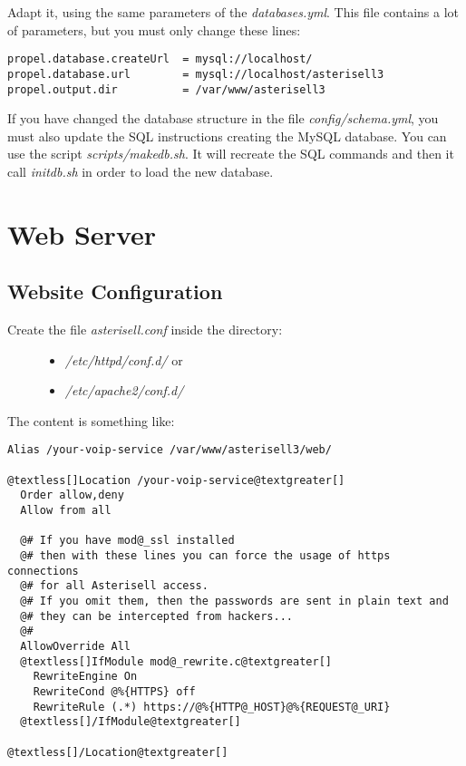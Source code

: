 \documentclass[letterpaper,10pt,english]{sphinxmanual}
\begin{document}
Adapt it, using the same parameters of the \emph{databases.yml}. This file contains a lot of parameters, but you must only change these lines:

\begin{Verbatim}[commandchars=@\[\]]
propel.database.createUrl  = mysql://localhost/
propel.database.url        = mysql://localhost/asterisell3
propel.output.dir          = /var/www/asterisell3
\end{Verbatim}

If you have changed the database structure in the file \emph{config/schema.yml}, you must also update the SQL instructions creating the MySQL database. You can use the script \emph{scripts/makedb.sh}. It will recreate the SQL commands and then it call \emph{initdb.sh} in order to load the new database.


\section{Web Server}
\label{index:web-server}

\subsection{Website Configuration}
\label{index:website-configuration}\begin{description}
\item[{Create the file \emph{asterisell.conf} inside the directory:}] \leavevmode\begin{itemize}
\item {} 
\emph{/etc/httpd/conf.d/} or

\item {} 
\emph{/etc/apache2/conf.d/}

\end{itemize}

\end{description}

The content is something like:

\begin{Verbatim}[commandchars=@\[\]]
Alias /your-voip-service /var/www/asterisell3/web/

@textless[]Location /your-voip-service@textgreater[]
  Order allow,deny
  Allow from all

  @# If you have mod@_ssl installed
  @# then with these lines you can force the usage of https connections
  @# for all Asterisell access.
  @# If you omit them, then the passwords are sent in plain text and
  @# they can be intercepted from hackers...
  @#
  AllowOverride All
  @textless[]IfModule mod@_rewrite.c@textgreater[]
    RewriteEngine On
    RewriteCond @%{HTTPS} off
    RewriteRule (.*) https://@%{HTTP@_HOST}@%{REQUEST@_URI}
  @textless[]/IfModule@textgreater[]

@textless[]/Location@textgreater[]
\end{Verbatim}
\end{document}
